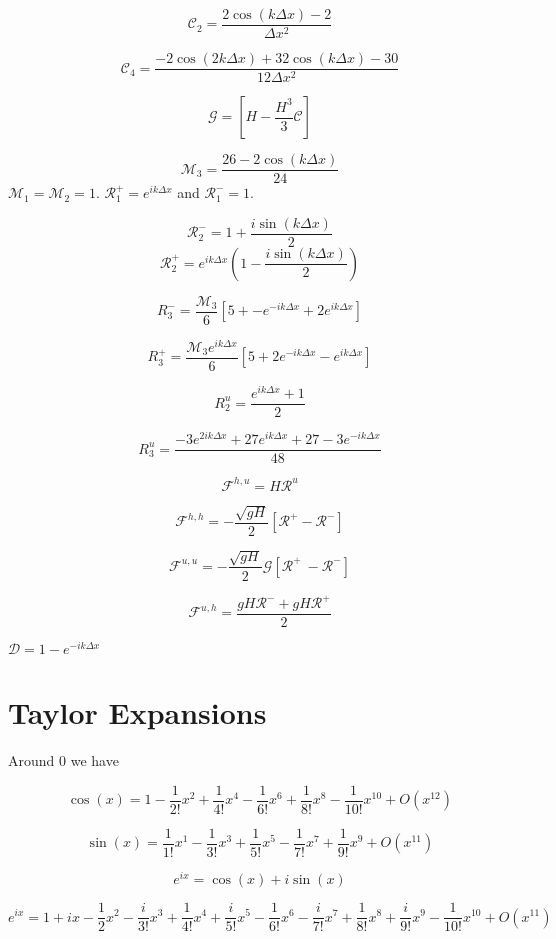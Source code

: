 \documentclass[12pt]{article}
\begin{document}
\[\mathcal{C}_2 = \frac{ 2\cos\left(k\Delta x\right) - 2 }{\Delta x^2}\]

\[\mathcal{C}_4 = \frac{-2\cos\left(2k\Delta x\right) + 32\cos\left(k\Delta x\right)  - 30 }{12\Delta x^2}\]

\[\mathcal{G} = \left[H -\frac{H^3}{3} \mathcal{C}\right]\]

\[\mathcal{M}_3= \frac{26  -2\cos\left(k\Delta x\right)}{24}\]
$\mathcal{M}_1 = \mathcal{M}_2 = 1$.
$\mathcal{R}^+_1 =  e^{ik\Delta x}$ and $\mathcal{R}^-_1 =  1$. 

\[\mathcal{R}_2^- = 1  + \frac{i\sin\left(k\Delta x\right)}{2}\]
\[\mathcal{R}_2^+ = e^{ik\Delta x}\left(1  - \frac{i\sin\left(k\Delta x\right)}{2} \right)\]

\[R_3^-= \frac{\mathcal{M}_3}{6}\left[5 +  - e^{-ik\Delta x} + 2e^{ik\Delta x} \right]\]

\[R_3^+= \frac{\mathcal{M}_3 e^{ik\Delta x }}{6}\left[5 + 2e^{-ik\Delta x} - e^{ik\Delta x} \right]\] 

\[R^u_2 = \frac{e^{ik\Delta x } + 1}{2} \]

\[R^u_3 = \frac{-3e^{2ik\Delta x } + 27e^{ik\Delta x } + 27 - 3e^{-ik\Delta x }}{48}\]


\[\mathcal{F}^{h,u} = H\mathcal{R}^u\]

\[\mathcal{F}^{h,h} = -\dfrac{ \sqrt{gH}}{ 2} \left [ \mathcal{R}^+- \mathcal{R}^- \right ]\]

\[\mathcal{F}^{u,u} = - \dfrac{ \sqrt{gH}}{ 2} \mathcal{G} \left [ \mathcal{R}^+ \ -  \mathcal{R}^-  \right ]\]

\[\mathcal{F}^{u,h} = \dfrac{ gH \mathcal{R}^- + gH \mathcal{R}^+}{ 2}\]


$\mathcal{D} = 1 -e^{-ik\Delta x}$

\section{Taylor Expansions}
Around $0$ we have

\[\cos\left(x\right) = 1 - \frac{1}{2!} x^2 + \frac{1}{4!} x^4 - \frac{1}{6!} x^6 + \frac{1}{8!} x^8 - \frac{1}{10!} x^{10} + O(x^{12})\]

\[\sin\left(x\right) = \frac{1}{1!} x^1 - \frac{1}{3!} x^3 + \frac{1}{5!} x^5 - \frac{1}{7!} x^7 + \frac{1}{9!} x^{9} + O(x^{11})\]

\[e^{ix} = \cos(x) + i \sin(x)\]

\[e^{ix} = 1 + i x  - \frac{1}{2} x^2 - \frac{i}{3!} x^3 + \frac{1}{4!} x^4 + \frac{i}{5!} x^5 - \frac{1}{6!} x^6 - \frac{i}{7!} x^7 + \frac{1}{8!} x^8 + \frac{i}{9!} x^{9} - \frac{1}{10!} x^{10}+ O(x^{11}) \]
\end{document}
